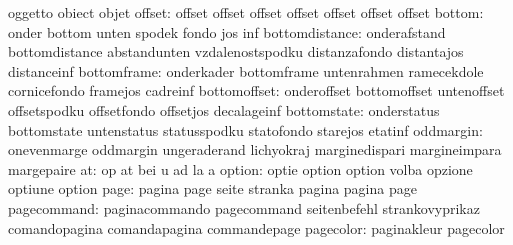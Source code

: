                            oggetto                   obiect
                           objet
                   offset: offset                    offset
                           offset                    offset
                           offset                    offset
                           offset
                   bottom: onder                     bottom
                           unten                     spodek
                           fondo                     jos
                           inf
           bottomdistance: onderafstand              bottomdistance
                           abstandunten              vzdalenostspodku
                           distanzafondo             distantajos
                           distanceinf
              bottomframe: onderkader                bottomframe
                           untenrahmen               ramecekdole
                           cornicefondo              framejos
                           cadreinf
             bottomoffset: onderoffset               bottomoffset
                           untenoffset               offsetspodku
                           offsetfondo               offsetjos
                           decalageinf
              bottomstate: onderstatus               bottomstate
                           untenstatus               statusspodku
                           statofondo                starejos
                           etatinf
                oddmargin: onevenmarge               oddmargin
                           ungeraderand              lichyokraj
                           marginedispari            margineimpara
                           margepaire
                       at: op                        at
                           bei                       u
                           ad                        la
                           a
                   option: optie                     option
                           option                    volba
                           opzione                   optiune
                           option
                     page: pagina                    page
                           seite                     stranka
                           pagina                    pagina
                           page
              pagecommand: paginacommando            pagecommand
                           seitenbefehl              strankovyprikaz
                           comandopagina             comandapagina
                           commandepage
                pagecolor: paginakleur               pagecolor
